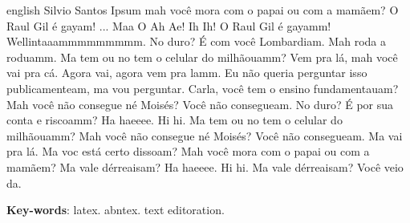 \begin{resumo}[Abstract]
 \begin{otherlanguage*}{english}
  Silvio Santos Ipsum mah você mora com o papai ou com a mamãem? O Raul Gil é gayam! ... Maa O Ah Ae! Ih Ih! O Raul Gil é gayamm! Wellintaaammmmmmmmm. No duro? É com você Lombardiam. Mah roda a roduamm. Ma tem ou no tem o celular do milhãouamm? Vem pra lá, mah você vai pra cá. Agora vai, agora vem pra lamm. Eu não queria perguntar isso publicamenteam, ma vou perguntar. Carla, você tem o ensino fundamentauam? Mah você não consegue né Moisés? Você não consegueam. No duro? É por sua conta e riscoamm? Ha haeeee. Hi hi. Ma tem ou no tem o celular do milhãouamm? Mah você não consegue né Moisés? Você não consegueam. Ma vai pra lá. Ma voc está certo dissoam? Mah você mora com o papai ou com a mamãem? Ma vale dérreaisam? Ha haeeee. Hi hi. Ma vale dérreaisam? Você veio da.

   \vspace{\onelineskip}
 
   \noindent 
   \textbf{Key-words}: latex. abntex. text editoration.
 \end{otherlanguage*}
\end{resumo}
